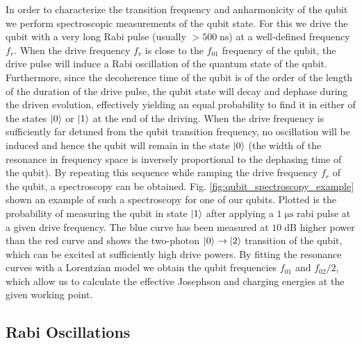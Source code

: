 In order to characterize the transition frequency and anharmonicity of the qubit we perform spectroscopic measurements of the qubit state. For this we drive the qubit with a very long Rabi pulse (usually $> 500\;\mathrm{ns}$) at a well-defined frequency $f_r$. When the drive frequency $f_r$ is close to the $f_{01}$ frequency of the qubit, the drive pulse will induce a Rabi oscillation of the quantum state of the qubit. Furthermore, since the decoherence time of the qubit is of the order of the length of the duration of the drive pulse, the qubit state will decay and dephase during the driven evolution, effectively yielding an equal probability to find it in either of the states $\left| 0 \right>$ or $\left| 1 \right>$ at the end of the driving. When the drive frequency is sufficiently far detuned from the qubit transition frequency, no oscillation will be induced and hence the qubit will remain in the state $\left| 0 \right>$ (the width of the resonance in frequency space is inversely proportional to the dephasing time of the qubit). By repeating this sequence while ramping the drive frequency $f_r$ of the qubit, a spectroscopy can be obtained. Fig. \ref{fig:qubit_spectroscopy_example} shown an example of such a spectroscopy for one of our qubits. Plotted is the probability of measuring the qubit in state $\left| 1 \right>$ after applying a $1\;\mathrm{\mu s}$ rabi pulse at a given drive frequency. The blue curve has been measured at $10\;\mathrm{dB}$ higher power than the red curve and shows the two-photon $\left| 0 \right>\to\left| 2 \right>$ transition of the qubit, which can be excited at sufficiently high drive powers. By fitting the resonance curves with a Lorentzian model we obtain the qubit frequencies $f_{01}$ and $f_{02}/2$, which allow us to calculate the effective Josephson and charging energies at the given working point.

\subsection{Rabi Oscillations} \label{section:qubit_rabi}

